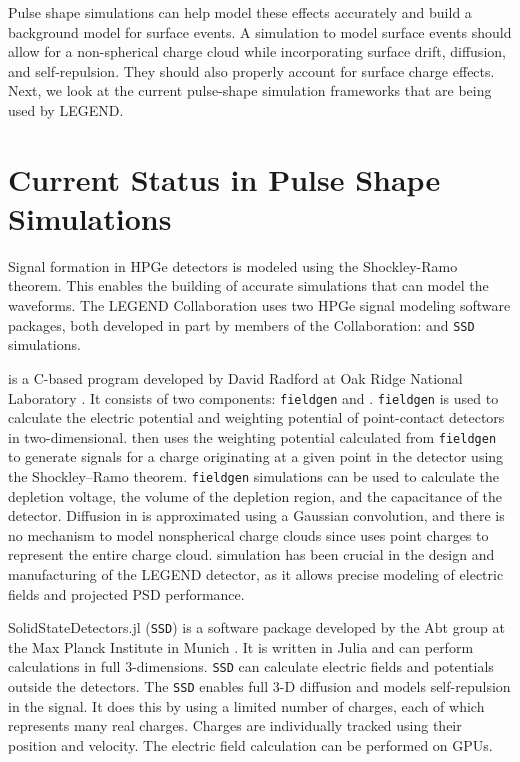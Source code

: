 Pulse shape simulations can help model these effects accurately and build a background model for surface events. A simulation to model surface events should allow for a non-spherical charge cloud while incorporating surface drift, diffusion, and self-repulsion. They should also properly account for surface charge effects. Next, we look at the current pulse-shape simulation frameworks that are being used by LEGEND.

\section{Current Status in Pulse Shape Simulations}

Signal formation in HPGe detectors is modeled using the Shockley-Ramo theorem. This enables the building of accurate simulations that can model the waveforms. The LEGEND Collaboration uses two HPGe signal modeling software packages, both developed in part by members of the Collaboration: {\siggen} and \texttt{SSD} simulations. 

{\siggen} is a C-based program developed by David Radford at Oak Ridge National Laboratory \cite{siggen_paper}. It consists of two components: \texttt{fieldgen} and {\siggen}. \texttt{fieldgen} is used to calculate the electric potential and weighting potential of point-contact detectors in two-dimensional. {\siggen} then uses the weighting potential calculated from \texttt{fieldgen} to generate signals for a charge originating at a given point in the detector using the Shockley–Ramo theorem. \texttt{fieldgen} simulations can be used to calculate the depletion voltage, the volume of the depletion region, and the capacitance of the detector. Diffusion in {\siggen} is approximated using a Gaussian convolution, and there is no mechanism to model nonspherical charge clouds since {\siggen} uses point charges to represent the entire charge cloud. {\siggen} simulation has been crucial in the design and manufacturing of the LEGEND detector, as it allows precise modeling of electric fields and projected PSD performance.


SolidStateDetectors.jl (\texttt{SSD}) is a software package developed by the Abt group at the Max Planck Institute in Munich \cite{Abt:2021SSD}. It is written in Julia and can perform calculations in full 3-dimensions. \texttt{SSD} can calculate electric fields and potentials outside the detectors. The \texttt{SSD} enables full 3-D diffusion and models self-repulsion in the signal. It does this by using a limited number of charges, each of which represents many real charges. Charges are individually tracked using their position and velocity. The electric field calculation can be performed on GPUs. 


